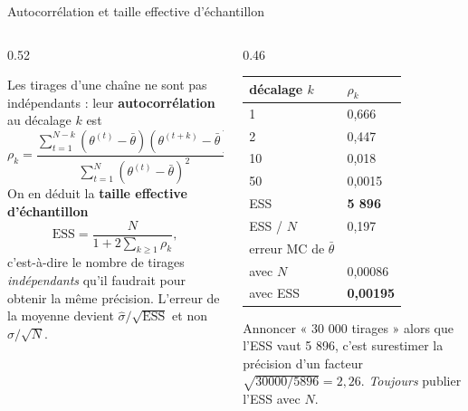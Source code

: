 \begin{frame}{Autocorrélation et taille effective d'échantillon}
\footnotesize
\begin{columns}[t]
\begin{column}{0.52\textwidth}
\begin{ebox}[Définition]
Les tirages d'une chaîne ne sont pas indépendants : leur \textbf{autocorrélation}
au décalage $k$ est
\[
\rho_k = \frac{\sum_{t=1}^{N-k}(\theta^{(t)} - \bar\theta)(\theta^{(t+k)} - \bar\theta)}
{\sum_{t=1}^{N}(\theta^{(t)} - \bar\theta)^2}.
\]
On en déduit la \textbf{taille effective d'échantillon}
\[
\mathrm{ESS} = \frac{N}{1 + 2\sum_{k \ge 1}\rho_k},
\]
c'est-à-dire le nombre de tirages \emph{indépendants} qu'il faudrait pour obtenir
la même précision. L'erreur de la moyenne devient $\hat\sigma/\sqrt{\mathrm{ESS}}$
et non $\hat\sigma/\sqrt{N}$.
\end{ebox}
\end{column}
\begin{column}{0.46\textwidth}
\begin{solbox}
\begin{tabular}{@{}ll@{}}
\toprule
décalage $k$ & $\rho_k$ \\
\midrule
1 & 0,666 \\
2 & 0,447 \\
10 & 0,018 \\
50 & 0,0015 \\
\midrule
ESS & \textbf{5 896} \\
ESS / $N$ & 0,197 \\
erreur MC de $\bar\theta$ & \\
\quad avec $N$ & 0,00086 \\
\quad avec ESS & \textbf{0,00195} \\
\bottomrule
\end{tabular}
\end{solbox}
\begin{wbox}
Annoncer « 30 000 tirages » alors que l'ESS vaut 5 896, c'est surestimer la
précision d'un facteur $\sqrt{30000/5896} = 2{,}26$.
\emph{Toujours} publier l'ESS avec $N$.
\end{wbox}
\end{column}
\end{columns}
\end{frame}

